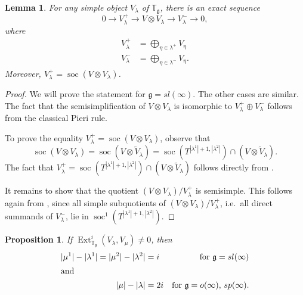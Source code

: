\documentclass{amsart}
\renewcommand{\sl}{sl}
\newcommand{\so}{o}
\newcommand{\Tg}{\mathbb T_{\mathfrak g}}
\renewcommand{\sp}{sp}
\renewcommand{\gg}{\mathfrak{g}}
\newtheorem{lemma}[thm]{Lemma}
\newtheorem{prop}[thm]{Proposition}
\theoremstyle{definition}
\numberwithin{equation}{section}
\begin{document}
\begin{lemma} \label{les}
For any simple object $V_\lambda$ of $\Tg$, there is an exact sequence
$$0\to V^+_\lambda\to V\otimes V_\lambda\to V_\lambda^-\to 0,$$
where
\begin{align*}
V^+_\lambda&=\bigoplus_{\eta\in\lambda^+}V_\eta\\
 V^-_\lambda&=\bigoplus_{\eta\in\lambda^-}V_\eta.
\end{align*}
Moreover, $V^+_\lambda=\operatorname{soc} (V\otimes V_\lambda)$.
\end{lemma}
\begin{proof} We will prove the statement for $\gg=\sl(\infty)$. The other
cases are similar. The fact that the semisimplification of $V\otimes V_\lambda$ is isomorphic to $ V^+_\lambda \oplus V^-_\lambda$ follows from the classical Pieri rule. 

To prove the equality $V^+_\lambda=\operatorname{soc} (V\otimes V_\lambda)$, observe that
$$\operatorname{soc} (V\otimes V_\lambda)= \operatorname{soc}
(V\otimes \tilde{V}_\lambda)=  \operatorname{soc}(T^{|\lambda^1|+1,|\lambda^2|})\cap(V\otimes \tilde{V}_\lambda).$$
The fact that $V^+_\lambda= \operatorname{soc}(T^{|\lambda^1|+1,|\lambda^2|})\cap(V\otimes \tilde{V}_\lambda)$
follows directly from \cite[Theorem 2.3]{PStyr}.

It remains to show that the quotient $(V\otimes V_\lambda) / V^+_\lambda$ is semisimple. This follows again from
\cite[Theorem 2.3]{PStyr}, since all simple subquotients of $(V\otimes V_\lambda) / V^+_\lambda$, i.e.\ all direct summands of
$V^-_\lambda$, lie in $\operatorname{soc}^1(T^{|\lambda^1|+1,|\lambda^2|})$.
\end{proof}



\begin{prop}\label{ext} 
If $\operatorname{Ext}^i_{\Tg}(V_\lambda,V_\mu)\neq  0$, then
\begin{align*}
|\mu^1|-|\lambda^1|=|\mu^2|-|\lambda^2|&=i & \textrm{for } \gg=\sl(\infty)\\
\intertext{and}
|\mu|-|\lambda|&=2i & \textrm{for }  \gg=\so(\infty) \textrm{, } \sp(\infty).
\end{align*}
\end{prop}
\end{document}
